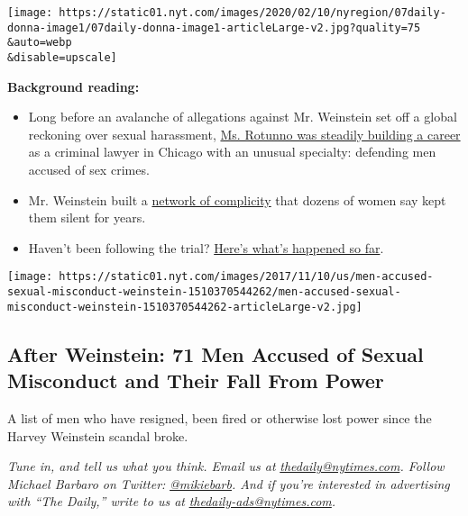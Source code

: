 \texttt{[image: https://static01.nyt.com/images/2020/02/10/nyregion/07daily-donna-image1/07daily-donna-image1-articleLarge-v2.jpg?quality=75\\\&auto=webp\\\&disable=upscale]}

\textbf{Background reading:}

\begin{itemize}
\item
  Long before an avalanche of allegations against Mr. Weinstein set off
  a global reckoning over sexual harassment,
  \href{https://www.nytimes.com/2020/01/14/nyregion/weinstein-woman-metoo.html}{Ms.
  Rotunno was steadily building a career} as a criminal lawyer in
  Chicago with an unusual specialty: defending men accused of sex
  crimes.
\item
  Mr. Weinstein built a
  \href{https://www.nytimes.com/interactive/2017/12/05/us/harvey-weinstein-complicity.html}{network
  of complicity} that dozens of women say kept them silent for years.
\item
  Haven't been following the trial?
  \href{https://www.nytimes.com/2020/02/06/nyregion/harvey-weinstein-trial.html}{Here's
  what's happened so far}.
\end{itemize}

\href{https://www.nytimes.com/interactive/2017/11/10/us/men-accused-sexual-misconduct-weinstein.html}{}

\texttt{[image: https://static01.nyt.com/images/2017/11/10/us/men-accused-sexual-misconduct-weinstein-1510370544262/men-accused-sexual-misconduct-weinstein-1510370544262-articleLarge-v2.jpg]}

\hypertarget{after-weinstein-71-men-accused-of-sexual-misconduct-and-their-fall-from-power}{%
\subsection{After Weinstein: 71 Men Accused of Sexual Misconduct and
Their Fall From
Power}\label{after-weinstein-71-men-accused-of-sexual-misconduct-and-their-fall-from-power}}

A list of men who have resigned, been fired or otherwise lost power
since the Harvey Weinstein scandal broke.

\emph{Tune in, and tell us what you think. Email us at}
\href{mailto:thedaily@nytimes.com}{\emph{thedaily@nytimes.com}}\emph{.
Follow Michael Barbaro on Twitter:}
\href{https://twitter.com/mikiebarb}{\emph{@mikiebarb}}\emph{. And if
you're interested in advertising with ``The Daily,'' write to us at}
\href{mailto:thedaily-ads@nytimes.com}{\emph{thedaily-ads@nytimes.com}}\emph{.}

